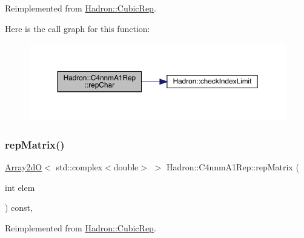 Reimplemented from \mbox{\hyperlink{structHadron_1_1CubicRep_af45227106e8e715e84b0af69cd3b36f8}{Hadron\+::\+Cubic\+Rep}}.

Here is the call graph for this function\+:
\nopagebreak
\begin{figure}[H]
\begin{center}
\leavevmode
\includegraphics[width=350pt]{d4/dbc/structHadron_1_1C4nnmA1Rep_a369d43e2f70764875daf2967ab976dad_cgraph}
\end{center}
\end{figure}
\mbox{\label{structHadron_1_1C4nnmA1Rep_afd420b29cea68de99ec5e175a42bafc7}} 
\subsubsection{\texorpdfstring{repMatrix()}{repMatrix()}\hspace{0.1cm}{\footnotesize\ttfamily [1/3]}}
{\footnotesize\ttfamily \mbox{\hyperlink{classADAT_1_1Array2dO}{Array2dO}}$<$ std\+::complex$<$double$>$ $>$ Hadron\+::\+C4nnm\+A1\+Rep\+::rep\+Matrix (\begin{DoxyParamCaption}\item[{int}]{elem }\end{DoxyParamCaption}) const\hspace{0.3cm}{\ttfamily [inline]}, {\ttfamily [virtual]}}



Reimplemented from \mbox{\hyperlink{structHadron_1_1CubicRep_ac5d7e9e6f4ab1158b5fce3e4ad9e8005}{Hadron\+::\+Cubic\+Rep}}.

